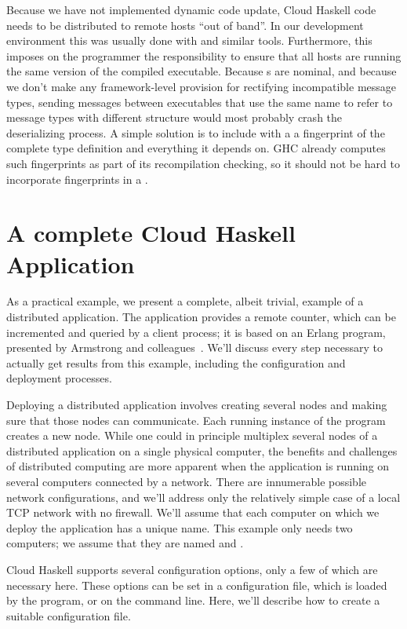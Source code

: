 \documentclass[preprint]{sigplanconf}
\begin{document}
Because we have not implemented dynamic code update, Cloud Haskell code needs to be distributed to remote hosts ``out of band''. In our development environment this was usually done with  and similar tools. Furthermore, this imposes on the programmer the responsibility to ensure that all hosts are running the same version of the compiled executable.  Because s are nominal, and because we don't make any framework-level provision for rectifying incompatible message types, sending messages between executables that use the same name to refer to message types with different structure would most probably crash the deserializing process.  A simple solution is to include with a  a fingerprint of the complete type definition and everything it depends on.  GHC already computes such fingerprints as part of its recompilation checking, so it should not be hard to incorporate fingerprints in a .


\section{A complete Cloud Haskell Application}
\label{s:completeApp}
As a practical example, we present a complete, albeit trivial, example of a distributed application. 
The application provides a remote counter, which can be incremented and queried by a client process; it is based on an Erlang program, presented by Armstrong and colleagues~\cite{Erlang93}. 
We'll discuss every step necessary to actually get results from this example, including the configuration and deployment processes.

Deploying a distributed application involves creating several nodes and making sure that those nodes can communicate. Each running instance of the program creates a new node. While one could in principle multiplex several nodes of a distributed application on a single physical computer, the benefits and challenges of distributed computing are more apparent when the application is running on several computers connected by a network. There are innumerable possible network configurations, and we'll address only the relatively simple case of a local TCP network with no firewall. We'll assume that each computer on which we deploy the application has a unique name. This example only needs two computers; we assume that they are named  and .

Cloud Haskell supports several configuration options, only a few of which are necessary here. These options can be set in a configuration file, which is loaded by the program, or on the command line. Here, we'll describe how to create a suitable configuration file.
\end{document}
